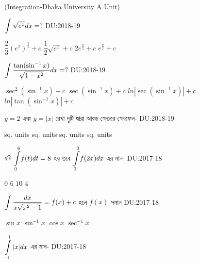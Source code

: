 \documentclass[addpoints]{exam}
\begin{document}
\begin{LARGE}
\begin{center}
 (Integration-Dhaka University A Unit)
\end{center}
\end{LARGE}
\begin{questions}
\question  $ \mathlarger{\int\sqrt{e^{x}}dx} =? $ \hfill \textsc{DU:2018-19}

\begin{oneparchoices}
\choice $ \dfrac{2}{3}(e^x)^{\frac{3}{2}} + c$ 
\choice $ \dfrac{1}{2}\sqrt{e^x} + c $
\choice $ 2e^{\frac{x}{2}} + c $
\choice $ e^{\frac{x}{2}} + c $

\end{oneparchoices}

\question  $ \mathlarger{\int\dfrac{\tan(\sin^{-1}x)}{\sqrt{1-x^{2}}} dx} =? $  \hfill \textsc{DU:2018-19}

\begin{oneparchoices}
\choice $ \sec^{2}(\sin^{-1}x) + c$ 
\choice $ \sec(\sin^{-1}x) + c $ 
\choice $ ln|\sec(\sin^{-1}x)| + c $
\choice $ ln|\tan(\sin^{-1}x)| + c $

\end{oneparchoices}
\question  $ y=2 $ এবং $ y=|x| $ রেখা দুটি দ্বারা আবদ্ধ ক্ষেত্রের ক্ষেত্রফল-  \hfill \textsc{DU:2018-19}

\begin{oneparchoices}
 sq. units
 sq. units
 sq. units
 sq. units

\end{oneparchoices}

\question  যদি $ \mathlarger{\int\limits_{0}^{6}}f(t)dt =8 $ হয় তবে $ \mathlarger{\int\limits_{0}^{3}}f(2x)dx $ এর মান-  \hfill \textsc{DU:2017-18}

\begin{oneparchoices}
\choice $ 0 $
\choice $ 6 $
\choice $ 10 $
\choice $ 4 $

\end{oneparchoices}

\question  $ \mathlarger{\int \dfrac{dx}{x\sqrt{x^2 -1}} = f(x)+c} $  হলে $ f(x) $ সমান  \hfill \textsc{DU:2017-18}

\begin{oneparchoices}
\choice $ \sin x $
\choice $ \sin^{-1}x $
\choice $ \cos x $
\choice $ \sec^{-1} x $

\end{oneparchoices}


\question $ \mathlarger{\int\limits_{-1}^{1}|x|dx} $ এর মান-  \hfill \textsc{DU:2017-18}


\end{questions}
\end{document}
